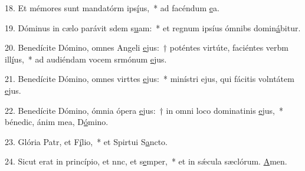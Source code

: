 18. Et mémores sunt mandatórm ips\uline{í}us,~* ad facéndum \uline{e}a.\par 
19. Dóminus in cælo parávit sdem s\uline{u}am:~* et regnum ipsíus ómnibs domin\uline{á}bitur.\par 
20. Benedícite Dómino, omnes Angeli \uline{e}jus:~† poténtes virtúte, faciéntes verbm ill\uline{í}us,~* ad audiéndam vocem srmónum \uline{e}jus.\par 
21. Benedícite Dómino, omnes virttes \uline{e}jus:~* minístri ejus, qui fácitis volntátem \uline{e}jus.\par 
22. Benedícite Dómino, ómnia ópera \uline{e}jus:~† in omni loco dominatinis \uline{e}jus,~* bénedic, ánim mea, D\uline{ó}mino.\par 
23. Glória Patr, et F\uline{í}lio,~* et Spirtui S\uline{a}ncto.\par 
24. Sicut erat in princípio, et nnc, et s\uline{e}mper,~* et in sǽcula sæclórum. \uline{A}men.\par 
